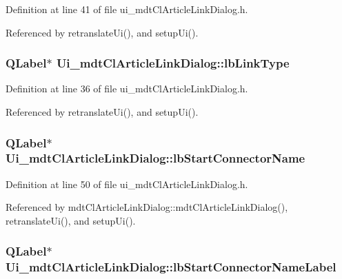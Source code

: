 Definition at line 41 of file ui\-\_\-mdt\-Cl\-Article\-Link\-Dialog.\-h.



Referenced by retranslate\-Ui(), and setup\-Ui().

\hypertarget{class_ui__mdt_cl_article_link_dialog_a4ed69aae1565241d8dd0f8f451c38b76}{
\subsubsection[{lb\-Link\-Type}]{\setlength{\rightskip}{0pt plus 5cm}Q\-Label$\ast$ Ui\-\_\-mdt\-Cl\-Article\-Link\-Dialog\-::lb\-Link\-Type}}\label{class_ui__mdt_cl_article_link_dialog_a4ed69aae1565241d8dd0f8f451c38b76}


Definition at line 36 of file ui\-\_\-mdt\-Cl\-Article\-Link\-Dialog.\-h.



Referenced by retranslate\-Ui(), and setup\-Ui().

\hypertarget{class_ui__mdt_cl_article_link_dialog_a7b96feb0c00fc3dcb432f022e0f64442}{
\subsubsection[{lb\-Start\-Connector\-Name}]{\setlength{\rightskip}{0pt plus 5cm}Q\-Label$\ast$ Ui\-\_\-mdt\-Cl\-Article\-Link\-Dialog\-::lb\-Start\-Connector\-Name}}\label{class_ui__mdt_cl_article_link_dialog_a7b96feb0c00fc3dcb432f022e0f64442}


Definition at line 50 of file ui\-\_\-mdt\-Cl\-Article\-Link\-Dialog.\-h.



Referenced by mdt\-Cl\-Article\-Link\-Dialog\-::mdt\-Cl\-Article\-Link\-Dialog(), retranslate\-Ui(), and setup\-Ui().

\hypertarget{class_ui__mdt_cl_article_link_dialog_adb9588f4cb287c75903043322fd0ddc3}{
\subsubsection[{lb\-Start\-Connector\-Name\-Label}]{\setlength{\rightskip}{0pt plus 5cm}Q\-Label$\ast$ Ui\-\_\-mdt\-Cl\-Article\-Link\-Dialog\-::lb\-Start\-Connector\-Name\-Label}}\label{class_ui__mdt_cl_article_link_dialog_adb9588f4cb287c75903043322fd0ddc3}


